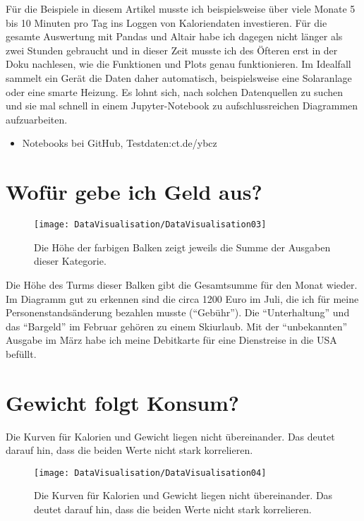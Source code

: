 Für die Beispiele in diesem Artikel musste ich beispielsweise über viele Monate 5 bis 10 Minuten pro Tag ins Loggen von Kaloriendaten investieren. Für die gesamte Auswertung mit Pandas und Altair habe ich dagegen nicht länger als zwei Stunden gebraucht und in dieser Zeit musste ich des Öfteren erst in der Doku nachlesen, wie die Funktionen und Plots genau funktionieren. Im Idealfall sammelt ein Gerät die Daten daher automatisch, beispielsweise eine Solaranlage oder eine smarte Heizung. Es lohnt sich, nach solchen Datenquellen zu suchen und sie mal schnell in einem Jupyter-Notebook zu aufschlussreichen Diagrammen aufzuarbeiten. 

\begin{itemize}
  \item Notebooks bei GitHub, Testdaten:ct.de/ybcz
\end{itemize}


\section{Wofür gebe ich Geld aus?}


\begin{figure}
	\texttt{[image: DataVisualisation/DataVisualisation03]}
	\caption[Summe der Ausgaben]{Die Höhe der farbigen Balken zeigt jeweils die Summe der Ausgaben dieser Kategorie.}
\end{figure}


 Die Höhe des Turms dieser Balken gibt die Gesamtsumme für den Monat wieder. Im Diagramm gut zu erkennen sind die circa 1200 Euro im Juli, die ich für meine Personenstandsänderung bezahlen musste (``Gebühr''). Die ``Unterhaltung'' und das ``Bargeld'' im Februar gehören zu einem Skiurlaub. Mit der ``unbekannten'' Ausgabe im März habe ich meine Debitkarte für eine Dienstreise in die USA befüllt.

\section{Gewicht folgt Konsum?}

Die Kurven für Kalorien und Gewicht liegen nicht übereinander. Das deutet darauf hin, dass die beiden Werte nicht stark korrelieren.




\begin{figure}
	\texttt{[image: DataVisualisation/DataVisualisation04]}
	\caption[Kurven für Kalorien und Gewicht]{Die Kurven für Kalorien und Gewicht liegen nicht übereinander. Das deutet darauf hin, dass die beiden Werte nicht stark korrelieren.}
\end{figure}

